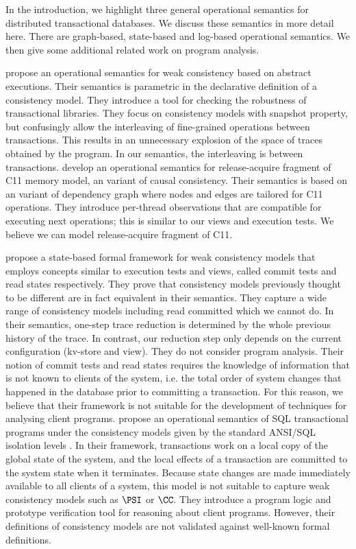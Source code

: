 In the introduction, we highlight three general operational semantics for 
distributed transactional databases.
We discuss these semantics in more detail here.
There are graph-based, state-based and log-based operational semantics.
We then give some additional related work on program analysis. 

\citet{sureshConcur} propose an operational semantics for weak consistency based on abstract executions. 
Their semantics is parametric in the declarative definition of a consistency model. 
They introduce a tool for checking the robustness of transactional  libraries.
They focus on consistency models with snapshot property, but confusingly allow 
the interleaving of fine-grained operations between transactions. 
This results in an unnecessary explosion of the space of traces obtained by 
the program. In our semantics, the interleaving is between transactions.
\citet{op-semantics-c11-rar} develop an operational semantics for release-acquire fragment of
C11 memory model, an variant of causal consistency.
Their semantics is based on an variant of dependency graph where nodes and edges 
are tailored for C11 operations.
They introduce per-thread observations that are compatible for executing next operations;
this is similar to our views and execution tests.
We believe we can model release-acquire fragment of C11.

\citet{seebelieve} propose a state-based formal framework for weak consistency models 
that employs concepts  similar to execution tests and views, called commit tests and read states respectively.
They prove that consistency models previously thought to be different are in fact equivalent in their semantics. 
They capture a wide range of consistency models including read committed which we cannot do. 
In their semantics, one-step trace reduction is determined by the whole previous history of the trace. 
In contrast, our reduction step only depends on the current configuration (kv-store and view).
They do not consider program analysis. Their notion of commit tests and read states requires 
the knowledge of information that is not known to clients of the system, i.e. the total order of system changes that happened in the database 
prior to committing a transaction. For this reason, we believe that
their framework is not suitable for the development of techniques for analysing client programs. 
\citet{alonetogether} propose an operational semantics of SQL transactional programs 
under the consistency models given by the standard ANSI/SQL isolation levels \cite{si}.
In their  framework, transactions work on a local copy of the global state 
of the system, and the local effects of a transaction are committed to the  
system state when it terminates. Because state changes 
are made immediately available to all clients of a system, this model 
is not suitable to capture weak consistency models such as \(\PSI\) or \(\CC\). 
They introduce a program logic and prototype verification tool for reasoning 
about client programs. However, their definitions of consistency models 
are not validated against well-known formal definitions.

